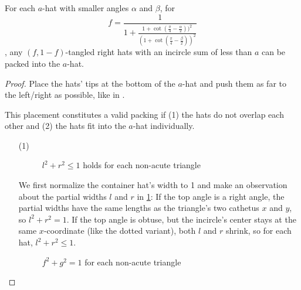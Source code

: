 \documentclass[%
    a4paper,              %
    style=print,          %
    bibliography=totoc,   %
    nexus,                %
    lnum,                 %
    extramargin,          %
]{tubsbook}
\begin{document}
\begin{lemma}\label{th:hatsinhat}
    For each $a$-hat with smaller angles $\alpha$ and $\beta$,
    for $$f = \frac{1}{1+\frac{1+\cot(\frac{\pi}{4}-\frac{\alpha}{2}))^2}{(1+\cot(\frac{\pi}{4}-\frac{\beta}{2}))^2}}$$,
    any $(f,1-f)$-tangled right hats with an incircle sum of less than $a$ can be packed into the $a$-hat.
\end{lemma}

\begin{proof}
    Place the hats' tips at the bottom of the $a$-hat and push them as far to the left/right as possible, like in .

    This placement constitutes a valid packing if (1) the hats do not overlap each other and (2) the hats fit into the $a$-hat individually.
    \begin{itemize}
        \item[(1)]
            \begin{figure}[tb]
                \centering


                \caption{$l^2 + r^2 \le 1$ holds for each non-acute triangle}
                \label{fig:hatlr}
            \end{figure}

            We first normalize the container hat's width to 1 and make an observation about the partial widths $l$ and $r$ in \cref{fig:hatlr}: If the top angle is a right angle, the partial widths have the same lengths as the triangle's two cathetus $x$ and $y$, so $l^2 + r^2 = 1$. If the top angle is obtuse, but the incircle's center stays at the same $x$-coordinate (like the dotted variant), both $l$ and $r$ shrink, so for each hat, $l^2 + r^2 \le 1$.

            \begin{figure}[tb]
                \centering


                \caption{$f^2 + g^2 = 1$ for each non-acute triangle}
                \label{fig:hatsoverlap}
            \end{figure}


\end{itemize}
\end{proof}
\end{document}
